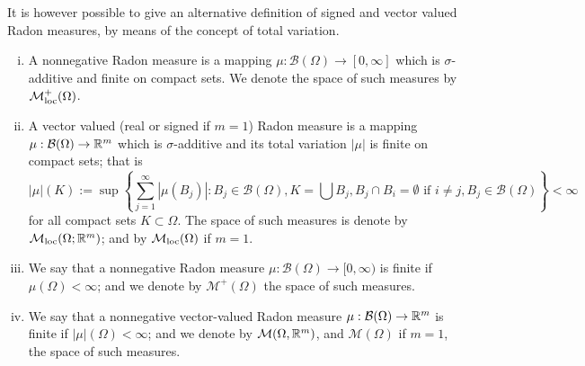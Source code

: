 It is however possible to give an alternative definition of signed and vector valued Radon measures, by means of the concept of total variation.

\begin{definition} \label{def:alternative_def_Radon} \hfill
\begin{enumerate}[i)]
\item A nonnegative Radon measure is a mapping $\mu : \mathcal{B}(\Omega) \to
[0,\infty]$ which is $\sigma$-additive and finite on compact sets. We denote the space of such measures by $\mathcal{M}_{\rm loc}^{+}(\Omega)$.
\item A vector valued (real or signed if $m = 1$) Radon measure is a mapping $\mu :
\mathcal{B}(\Omega) \to \mathbb{R}^m$ which is $\sigma$-additive and its total variation
$|\mu|$ is finite on compact sets; that is
\[
|\mu|(K) := \sup \left\{
\sum_{j=1}^\infty |\mu(B_j)| : B_{j} \in \mathcal{B}(\Omega), K = \bigcup B_j, B_j \cap B_i = \emptyset \text{ if } i\neq j, B_j \in \mathcal{B}(\Omega)
\right\} < \infty
\]
for all compact sets $K \subset \Omega$.
The space of such measures is denote by $\mathcal{M}_{\rm loc}(\Omega; \mathbb{R}^{m})$; and by $\mathcal{M}_{\rm loc}(\Omega)$ if $m = 1$.
\item We say that a nonnegative Radon measure $\mu : \mathcal{B}(\Omega) \to
[0,\infty)$ is finite if $\mu(\Omega) < \infty$; and we denote by $\mathcal{M}^+(\Omega)$ the space of such measures.
\item We say that a nonnegative vector-valued Radon measure $\mu : \mathcal{B}(\Omega) \to
\mathbb{R}^m$ is finite if $|\mu|(\Omega) < \infty$; and we denote by $\mathcal{M}(\Omega,\mathbb{R}^m)$, and $\mathcal{M}(\Omega)$ if $m = 1$, the space of such measures.
\end{enumerate}
\end{definition}

